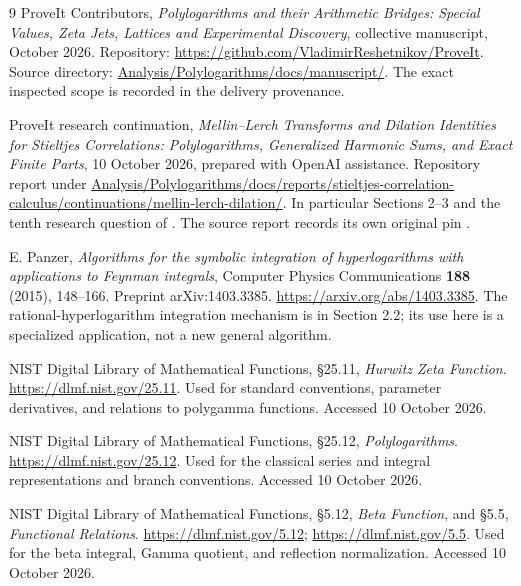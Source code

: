 \begin{thebibliography}{9}
ProveIt Contributors, \emph{Polylogarithms and their Arithmetic Bridges:
Special Values, Zeta Jets, Lattices and Experimental Discovery}, collective
manuscript, October 2026. Repository:
\url{https://github.com/VladimirReshetnikov/ProveIt}.
Source directory: \url{Analysis/Polylogarithms/docs/manuscript/}.
The exact inspected scope is recorded in the delivery provenance.

ProveIt research continuation, \emph{Mellin--Lerch Transforms and Dilation
Identities for Stieltjes Correlations: Polylogarithms, Generalized Harmonic
Sums, and Exact Finite Parts}, 10 October 2026, prepared with OpenAI
assistance. Repository report under
\url{Analysis/Polylogarithms/docs/reports/stieltjes-correlation-calculus/continuations/mellin-lerch-dilation/}.
In particular Sections 2--3 and the tenth research question of
. The source report records its own
original pin .

E. Panzer, \emph{Algorithms for the symbolic integration of hyperlogarithms
with applications to Feynman integrals}, Computer Physics Communications
\textbf{188} (2015), 148--166. Preprint arXiv:1403.3385.
\url{https://arxiv.org/abs/1403.3385}.
The rational-hyperlogarithm integration mechanism is in Section 2.2;
its use here is a specialized application, not a new general algorithm.

NIST Digital Library of Mathematical Functions, \S25.11, \emph{Hurwitz
Zeta Function}. \url{https://dlmf.nist.gov/25.11}.
Used for standard conventions, parameter derivatives, and relations to
polygamma functions. Accessed 10 October 2026.

NIST Digital Library of Mathematical Functions, \S25.12, \emph{Polylogarithms}.
\url{https://dlmf.nist.gov/25.12}. Used for the classical series and integral
representations and branch conventions. Accessed 10 October 2026.

NIST Digital Library of Mathematical Functions, \S5.12, \emph{Beta Function},
and \S5.5, \emph{Functional Relations}.
\url{https://dlmf.nist.gov/5.12}; \url{https://dlmf.nist.gov/5.5}.
Used for the beta integral, Gamma quotient, and reflection normalization.
Accessed 10 October 2026.
\end{thebibliography}
